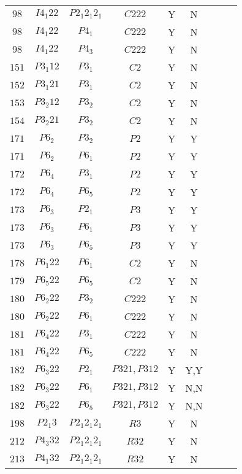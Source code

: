 \documentclass[12pt]{amsart}
\theoremstyle{definition}
\theoremstyle{remark}
\numberwithin{equation}{section}
\begin{document}
\begin{longtable}{c*{7}{c}c}
    $98$ & $I4_{1}22$ & $P2_{1}2_{1}2_1$ & $C222$ & Y & N \\
    $98$ & $I4_{1}22$ & $P4_1$ & $C222$ & Y & N \\
    $98$ & $I4_{1}22$ & $P4_3$ & $C222$ & Y & N \\
    $151$ & $P3_{1}12$ & $P3_1$ & $C2$ & Y & N \\
    $152$ & $P3_{1}21$ & $P3_1$ & $C2$ & Y & N \\
    $153$ & $P3_{2}12$ & $P3_2$ & $C2$ & Y & N \\
    $154$ & $P3_{2}21$ & $P3_2$ & $C2$ & Y & N \\
    $171$ & $P6_2$ & $P3_2$ & $P2$ & Y & Y \\
    $171$ & $P6_2$ & $P6_1$ & $P2$ & Y & Y \\
    $172$ & $P6_4$ & $P3_1$ & $P2$ & Y & Y \\
    $172$ & $P6_4$ & $P6_5$ & $P2$ & Y & Y \\
    $173$ & $P6_3$ & $P2_1$ & $P3$ & Y & Y \\
    $173$ & $P6_3$ & $P6_1$ & $P3$ & Y & Y \\
    $173$ & $P6_3$ & $P6_5$ & $P3$ & Y & Y \\
    $178$ & $P6_{1}22$ & $P6_1$ & $C2$ & Y & N \\
    $179$ & $P6_{5}22$ & $P6_5$ & $C2$ & Y & N \\
    $180$ & $P6_{2}22$ & $P3_2$ & $C222$ & Y & N \\
    $180$ & $P6_{2}22$ & $P6_1$ & $C222$ & Y & N \\
    $181$ & $P6_{4}22$ & $P3_1$ & $C222$ & Y & N \\
    $181$ & $P6_{4}22$ & $P6_5$ & $C222$ & Y & N \\
    $182$ & $P6_{3}22$ & $P2_1$ & $P321,P312$ & Y & Y,Y \\
    $182$ & $P6_{3}22$ & $P6_1$ & $P321,P312$ & Y & N,N \\
    $182$ & $P6_{3}22$ & $P6_5$ & $P321,P312$ & Y & N,N \\
    $198$ & $P2_{1}3$ & $P2_{1}2_{1}2_1$ & $R3$ & Y & N \\
    $212$ & $P4_{3}32$ & $P2_{1}2_{1}2_1$ & $R32$ & Y & N \\
    $213$ & $P4_{1}32$ & $P2_{1}2_{1}2_1$ & $R32$ & Y & N \\

\end{longtable}
\\ \\ 
\newpage
\end{document}
